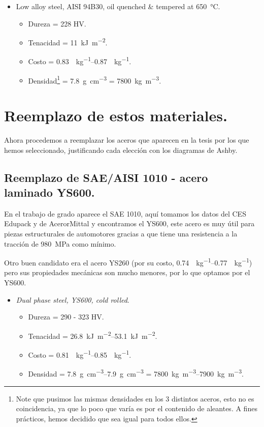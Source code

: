 \documentclass[15pt,a4paper]{article}
\begin{document}
\begin{itemize}
    \item Low alloy steel, AISI 94B30, oil quenched \& tempered at \SI{650}{\celsius}.
    \begin{itemize}
        \item Dureza = 228 HV.
        \item Tenacidad = \SI{11}{\kilo\joule\per\meter\squared}.
        \item Costo = \SIrange[range-phrase={ - }, range-units=single]{0,83}{0,87}{\per\kilogram}.
        \item Densidad\footnote{Note que pusimos las mismas densidades en los 3 distintos aceros, esto no es coincidencia, ya que lo poco que varía es por el contenido de aleantes. A fines prácticos, hemos decidido que sea igual para todos ellos.} = \SI{7,8}{\gram\per\centi\metre\cubed} = \SI{7800}{\kilogram\per\cubic\metre}.
    \end{itemize}
\end{itemize}

\section{Reemplazo de estos materiales.}

Ahora procedemos a reemplazar los aceros que aparecen en la tesis por los que hemos seleccionado, justificando cada elección con los diagramas de Ashby.

\subsection{Reemplazo de SAE/AISI 1010 - acero laminado YS600.}

En el trabajo de grado aparece el SAE 1010, aquí tomamos los datos del CES Edupack y de AcerorMittal y encontramos el YS600, este acero es muy útil para piezas estructurales de automotores gracias a que tiene una resistencia a la tracción de \SI{980}{\mega\pascal} como mínimo.

Otro buen candidato era el acero YS260 (por su costo, \SIrange[range-phrase={ - }, range-units=single]{0,74}{0,77}{\per\kilogram}) pero sus propiedades mecánicas son mucho menores, por lo que optamos por el YS600.

\begin{itemize}
    \item \textit{Dual phase steel, YS600, cold rolled}.
    \begin{itemize}
        \item Dureza = 290 - 323 HV.
        \item Tenacidad = \SIrange[range-phrase={ - }, range-units=single]{26,8}{53,1}{\kilo\joule\per\meter\squared}.
        \item Costo = \SIrange[range-phrase={ - }, range-units=single]{0,81}{0,85}{\per\kilogram}.
        \item Densidad = \SIrange[range-phrase={ - }, range-units=single]{7,8}{7,9}{\gram\per\centi\metre\cubed} = \SIrange[range-phrase={ - }, range-units=single]{7800}{7900}{\kilogram\per\cubic\metre}.
    \end{itemize}
\end{itemize}
\end{document}
